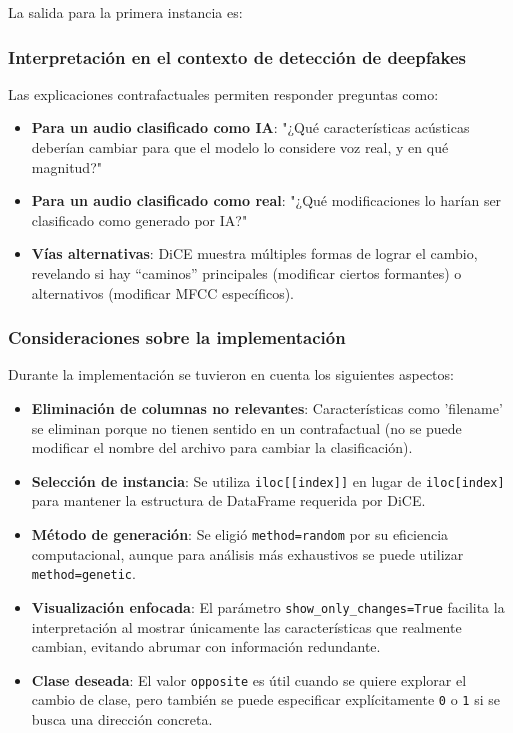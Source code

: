 La salida para la primera instancia es:

\subsubsection*{Interpretación en el contexto de detección de deepfakes}

Las explicaciones contrafactuales permiten responder preguntas como:

\begin{itemize}
    \item \textbf{Para un audio clasificado como IA}: "¿Qué características acústicas deberían cambiar para que el modelo lo considere voz real, y en qué magnitud?"
    
    \item \textbf{Para un audio clasificado como real}: "¿Qué modificaciones lo harían ser clasificado como generado por IA?"
    
    \item \textbf{Vías alternativas}: DiCE muestra múltiples formas de lograr el cambio, revelando si hay ``caminos'' principales (modificar ciertos formantes) o alternativos (modificar MFCC específicos).
\end{itemize}

\subsubsection*{Consideraciones sobre la implementación}

Durante la implementación se tuvieron en cuenta los siguientes aspectos:

\begin{itemize}
    \item \textbf{Eliminación de columnas no relevantes}: Características como 'filename' se eliminan porque no tienen sentido en un contrafactual (no se puede modificar el nombre del archivo para cambiar la clasificación).
    
    \item \textbf{Selección de instancia}: Se utiliza \texttt{iloc[[index]]} en lugar de \texttt{iloc[index]} para mantener la estructura de DataFrame requerida por DiCE.
    
    \item \textbf{Método de generación}: Se eligió \texttt{method=random} por su eficiencia computacional, aunque para análisis más exhaustivos se puede utilizar \texttt{method=genetic}.
    
    \item \textbf{Visualización enfocada}: El parámetro \texttt{show\_only\_changes=True} facilita la interpretación al mostrar únicamente las características que realmente cambian, evitando abrumar con información redundante.
    
    \item \textbf{Clase deseada}: El valor \texttt{opposite} es útil cuando se quiere explorar el cambio de clase, pero también se puede especificar explícitamente \texttt{0} o \texttt{1} si se busca una dirección concreta.
\end{itemize}